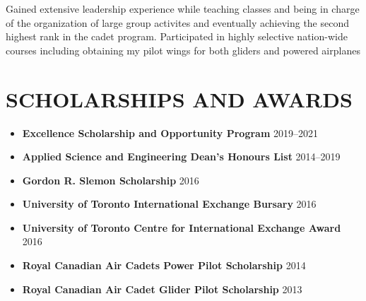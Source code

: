 \documentclass{ResumeTemplate}
\begin{document}
        \workitemstwo
        {Gained extensive leadership experience while teaching classes and being in charge of the organization of large group activites and eventually achieving the second highest rank in the cadet program.}
        {Participated in highly selective nation-wide courses including obtaining my pilot wings for both gliders and powered airplanes}

        \vspace*{\baselineskip}


        \section{SCHOLARSHIPS AND AWARDS}
        \begin{itemize}[noitemsep, leftmargin=*]
            \item \textbf{Excellence Scholarship and Opportunity Program} \hfill 2019--2021
            \item \textbf{Applied Science and Engineering Dean's Honours List} \hfill 2014--2019
            \item \textbf{Gordon R. Slemon Scholarship} \hfill 2016
            \item \textbf{University of Toronto International Exchange Bursary} \hfill 2016
            \item \textbf{University of Toronto Centre for International Exchange Award} \hfill 2016
            \item \textbf{Royal Canadian Air Cadets Power Pilot Scholarship} \hfill 2014
            \item \textbf{Royal Canadian Air Cadet Glider Pilot Scholarship} \hfill 2013
        \end{itemize}
\end{document}
